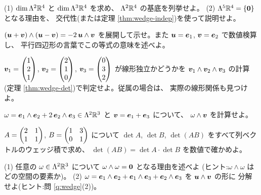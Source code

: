\begin{mondai}[基本]\label{q:wedge-ex3}
(1) $\dim \Lambda^2 \mathbb{R}^4$ と $\dim \Lambda^3 \mathbb{R}^4$ を求め、
$\Lambda^2 \mathbb{R}^4$ の基底を列挙せよ。
(2) $\Lambda^5 \mathbb{R}^4 = \{\bm{0}\}$ となる理由を、
交代性(または定理 \ref{thm:wedge-indep})を使って説明せよ。
\end{mondai}

\begin{mondai}[基本]\label{q:wedge-ex4}
$(\bm{u} + \bm{v}) \wedge (\bm{u} - \bm{v})
= -2\,\bm{u} \wedge \bm{v}$ を展開して示せ。また
$\bm{u} = \bm{e}_1$, $\bm{v} = \bm{e}_2$ で数値検算し、
平行四辺形の言葉でこの等式の意味を述べよ。
\end{mondai}

\begin{mondai}[標準]\label{q:wedge-ex5}
$\bm{v}_1 = \begin{pmatrix}1 \\ 2 \\ 1\end{pmatrix}$, $\bm{v}_2 = \begin{pmatrix}2 \\ 1 \\ 0\end{pmatrix}$,
$\bm{v}_3 = \begin{pmatrix}0 \\ 3 \\ 2\end{pmatrix}$ が線形独立かどうかを
$\bm{v}_1 \wedge \bm{v}_2 \wedge \bm{v}_3$ の計算
(定理 \ref{thm:wedge-det})で判定せよ。従属の場合は、
実際の線形関係も見つけよ。
\end{mondai}

\begin{mondai}[標準]\label{q:wedge-ex6}
$\omega = \bm{e}_1 \wedge \bm{e}_2 + 2\,\bm{e}_2 \wedge \bm{e}_3
\in \Lambda^2 \mathbb{R}^3$ と $\bm{v} = \bm{e}_1 + \bm{e}_3$ について、
$\omega \wedge \bm{v}$ を計算せよ。
\end{mondai}

\begin{mondai}[標準]\label{q:wedge-ex7}
$A = \begin{pmatrix}2 & 1 \\ 1 & 1\end{pmatrix}$, $B = \begin{pmatrix}1 & 3 \\ 0 & 1\end{pmatrix}$ について
$\det A$, $\det B$, $\det(AB)$ をすべて列ベクトルのウェッジ積で求め、
$\det(AB) = \det A \cdot \det B$ を数値で確かめよ。
\end{mondai}

\begin{mondai}[標準]\label{q:wedge-ex8}
(1) 任意の $\omega \in \Lambda^2 \mathbb{R}^3$ について
$\omega \wedge \omega = \bm{0}$ となる理由を述べよ
(ヒント:$\omega \wedge \omega$ はどの空間の要素か)。
(2) $\omega = \bm{e}_1 \wedge \bm{e}_2 + \bm{e}_1 \wedge \bm{e}_3
+ \bm{e}_2 \wedge \bm{e}_3$ を $\bm{u} \wedge \bm{v}$ の形に
分解せよ(ヒント:問 \ref{q:wedge}(2))。
\end{mondai}

